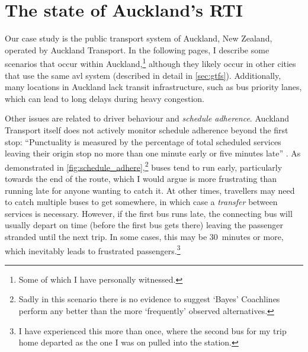 \section{The state of Auckland's RTI}
\label{sec:auckland_etas}

Our case study is the public transport system of Auckland, New Zealand, operated by Auckland Transport. In the following pages, I describe some scenarios that occur within Auckland,\footnote{Some of which I have personally witnessed.} although they likely occur in other cities that use the same \gls{avl} system (described in detail in \cref{sec:gtfs}). Additionally, many locations in Auckland lack transit infrastructure, such as bus priority lanes, which can lead to long delays during heavy congestion.


Other issues are related to driver behaviour and \emph{schedule adherence}. Auckland Transport itself does not actively monitor schedule adherence beyond the first stop: ``Punctuality is measured by the percentage of total scheduled services leaving their origin stop no more than one minute early or five minutes late'' \citep[13]{AT_report_2019}. As demonstrated in \cref{fig:schedule_adhere},\footnote{Sadly in this scenario there is no evidence to suggest `Bayes' Coachlines perform any better than the more `frequently' observed alternatives.} buses tend to run early, particularly towards the end of the route, which I would argue is more frustrating than running late for anyone wanting to catch it. At other times, travellers may need to catch multiple buses to get somewhere, in which case a \emph{transfer} between services is necessary. However, if the first bus runs late, the connecting bus will usually depart on time (before the first bus gets there) leaving the passenger stranded until the next trip. In some cases, this may be 30~minutes or more, which inevitably leads to frustrated passengers.\footnote{I have experienced this more than once, where the second bus for my trip home departed as the one I was on pulled into the station.}


